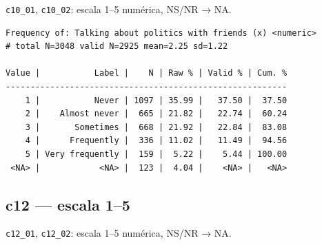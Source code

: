 \documentclass[
  letterpaper,
  DIV=11,
  numbers=noendperiod]{scrreprt}
\newenvironment{Shaded}{\begin{snugshade}}{\end{snugshade}}
\newcommand{\AttributeTok}[1]{\textcolor[rgb]{0.40,0.45,0.13}{#1}}
\newcommand{\FunctionTok}[1]{\textcolor[rgb]{0.28,0.35,0.67}{#1}}
\newcommand{\NormalTok}[1]{\textcolor[rgb]{0.00,0.23,0.31}{#1}}
\newcommand{\OtherTok}[1]{\textcolor[rgb]{0.00,0.23,0.31}{#1}}
\newcommand{\SpecialCharTok}[1]{\textcolor[rgb]{0.37,0.37,0.37}{#1}}
\begin{document}
\texttt{c10\_01}, \texttt{c10\_02}: escala 1--5 numérica, NS/NR → NA.

\begin{Shaded}
\end{Shaded}

\begin{verbatim}
Frequency of: Talking about politics with friends (x) <numeric> 
# total N=3048 valid N=2925 mean=2.25 sd=1.22

Value |           Label |    N | Raw % | Valid % | Cum. %
---------------------------------------------------------
    1 |           Never | 1097 | 35.99 |   37.50 |  37.50
    2 |    Almost never |  665 | 21.82 |   22.74 |  60.24
    3 |       Sometimes |  668 | 21.92 |   22.84 |  83.08
    4 |      Frequently |  336 | 11.02 |   11.49 |  94.56
    5 | Very frequently |  159 |  5.22 |    5.44 | 100.00
 <NA> |            <NA> |  123 |  4.04 |    <NA> |   <NA>
\end{verbatim}

\subsection{c12 --- escala 1--5}\label{c12-escala-15}

\texttt{c12\_01}, \texttt{c12\_02}: escala 1--5 numérica, NS/NR → NA.

\begin{Shaded}
\end{Shaded}
\end{document}
